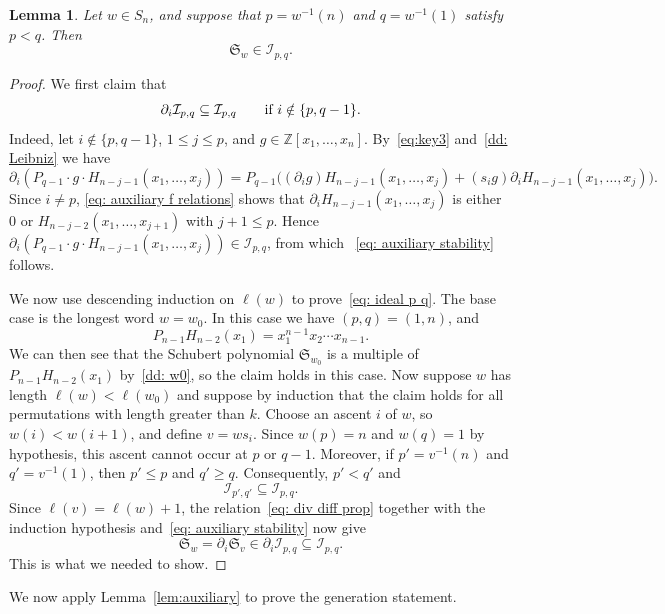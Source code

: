 \documentclass[11pt]{amsart}
\theoremstyle{plain}
\newtheorem{lem}[thm]{Lemma}
\theoremstyle{definition}
\newcommand{\Z}{\mathbb{ Z}}           %
\numberwithin{equation}{section}
\begin{document}
\begin{lem}\label{lemma: schubert poly for forbidden}\label{lem:auxiliary}
Let $w\in S_n$, and suppose that $p=w^{-1}(n)$ and $q=w^{-1}(1)$ satisfy $p<q$. Then
\begin{equation}\label{eq: ideal p q}
\mathfrak{S}_w\in\mathcal{I}_{p,q}.
\end{equation}
\end{lem}
\begin{proof}
We first claim that
\begin{equation}\label{eq: auxiliary stability}
\partial_i\mathcal{I}_{p,q}\subseteq\mathcal{I}_{p,q}
\qquad\textup{if }i\notin\{p,q-1\}.
\end{equation}
Indeed, let $i\notin\{p,q-1\}$, $1\leq j\leq p$, and $g\in\Z[x_1,\ldots,x_n]$. By~\eqref{eq:key3} and~\eqref{dd: Leibniz} we have 
\[
\partial_i(P_{q-1}\cdot g \cdot H_{n-j-1}(x_1,\ldots,x_j))
=P_{q-1}\bigl((\partial_i g)H_{n-j-1}(x_1,\ldots,x_j)
+(s_i g)\partial_i H_{n-j-1}(x_1,\ldots,x_j)\bigr).
\]
Since $i\neq p$, \eqref{eq: auxiliary f relations} shows that $\partial_i H_{n-j-1}(x_1,\ldots,x_j)$ is either $0$ or 
$H_{n-j-2}(x_1,\ldots,x_{j+1})$ with $j+1\leq p$. Hence $\partial_i(P_{q-1}\cdot g \cdot H_{n-j-1}(x_1,\ldots,x_j))\in\mathcal{I}_{p,q}$, from which ~\eqref{eq: auxiliary stability} follows.

We now use descending induction on $\ell(w)$ to prove~\eqref{eq: ideal p q}. The base case is the longest word $w=w_0$. In this case we have $(p,q)=(1,n)$, and
\[
P_{n-1}H_{n-2}(x_1)=x_1^{n-1}x_2\cdots x_{n-1}.
\]
We can then see that the Schubert polynomial $\mathfrak{S}_{w_0}$ is a multiple of $P_{n-1}H_{n-2}(x_1)$ by~\eqref{dd: w0}, so the claim holds in this case. Now suppose $w$ has length $\ell(w)<\ell(w_0)$ and suppose by induction that the claim holds for all permutations with length greater than $k$. Choose an ascent $i$ of $w$, so $w(i)<w(i+1)$, and define $v=ws_i$. Since $w(p)=n$ and $w(q)=1$ by hypothesis, this ascent cannot occur at $p$ or $q-1$. Moreover, if $p'=v^{-1}(n)$ and $q'=v^{-1}(1)$, then $p'\leq p$ and $q'\geq q$. Consequently, $p'<q'$ and 
\[
\mathcal{I}_{p',q'}\subseteq\mathcal{I}_{p,q}.
\]
Since $\ell(v)=\ell(w)+1$, the relation~\eqref{eq: div diff prop} together with the induction hypothesis and~\eqref{eq: auxiliary stability} now give
\[
\mathfrak{S}_w=\partial_i\mathfrak{S}_v
\in\partial_i\mathcal{I}_{p,q}\subseteq\mathcal{I}_{p,q}.
\]
This is what we needed to show.
\end{proof}

We now apply Lemma~\ref{lem:auxiliary} to prove the generation statement. 
\end{document}
